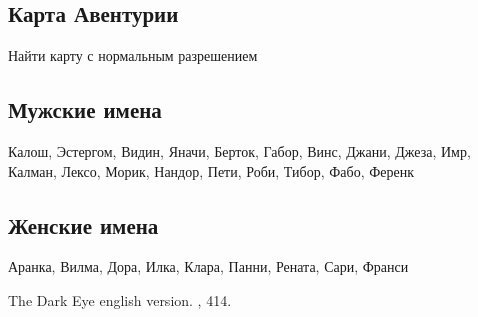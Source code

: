 \documentclass[twoside,twocolumn]{article}
\begin{document}
\subsection{Карта Авентурии}
Найти карту с нормальным разрешением

\subsection{Мужские имена}
Калош, Эстергом, Видин, Яначи, Берток, Габор, Винс, Джани, Джеза, Имр, Калман, Лексо, Морик, Нандор, Пети, Роби, Тибор, Фабо, Ференк

\subsection{Женские имена}
Аранка, Вилма, Дора, Илка, Клара, Панни, Рената, Сари, Франси


\begin{thebibliography}{99} %

\newblock The Dark Eye english version.
, 414.
 
\end{thebibliography}

\end{document}
